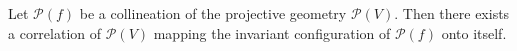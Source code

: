 Let $\mathcal{P}(f)$ be a collineation of the projective geometry $\mathcal{P}(V)$. Then there exists a correlation of $\mathcal{P}(V)$ mapping the invariant configuration of $\mathcal{P}(f)$ onto itself.

